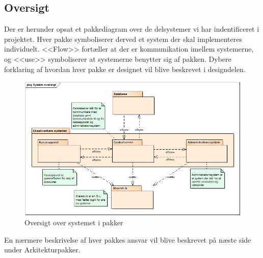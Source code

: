 \subsection{Oversigt}\label{logical:oversigt}

Der er herunder opsat et pakkediagram over de delsystemer vi har indentificeret i projektet. Hver pakke symboliserer derved et system der skal implementeres individuelt. <<Flow>> fortæller at der er kommunikation imellem systemerne, og <<use>> symboliserer at systemerne benytter sig af pakken. Dybere forklaring af hvordan hver pakke er designet vil blive beskrevet i designdelen.

\begin{figure}[ht]
	\centering
    \includegraphics[scale=1]{Systemarkitektur/LogiskView/systemoversigt}
    \caption{Oversigt over systemet i pakker}
    \label{fig:system_oversigt}
\end{figure}

En nærmere beskrivelse af hver pakkes ansvar vil blive beskrevet på næste side under Arkitekturpakker.

\newpage

